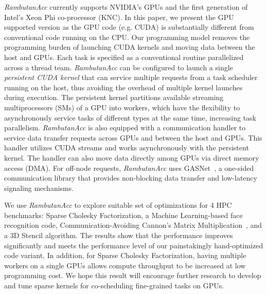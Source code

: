 {\em RambutanAcc} currently supports NVIDIA's GPUs and the first generation of Intel's Xeon Phi co-processor (KNC).
In this paper, we present the GPU supported version as the GPU code (e.g. CUDA) is substantially different from conventional code running on the CPU.
Our programming model removes the programming burden of launching CUDA kernels and moving data between the host and GPUs.
Each task is specified as a conventional routine parallelized across a thread team.
{\em RambutanAcc} can be configured to launch a single {\em persistent CUDA kernel} that can service multiple requests from a task scheduler running on the host, thus avoiding the overhead of multiple kernel launches during execution.
The persistent kernel partitions available streaming multiprocessors (SMs) of a GPU into workers, which have the flexibility to asynchronously service tasks of different types at the same time, increasing task parallelism.
{\em RambutanAcc} is also equipped with a communication handler to service data transfer requests across GPUs and between the host and GPUs.
This handler utilizes CUDA streams and works asynchronously with the persistent kernel.
The handler can also move data directly among GPUs via direct memory access (DMA).
For off-node requests, {\em RambutanAcc} uses GASNet~\cite{Bonachea:2002:gasnet}, a one-sided communication library %
that provides non-blocking data transfer and low-latency signaling mechanisms. %

We use {\em RambutanAcc} to explore suitable set of optimizations for 4 HPC benchmarks: Sparse Cholesky Factorization, a Machine Learning-based face recognition code, Communication-Avoiding Cannon's Matrix Multiplication~\cite{25Dcannon}, and a 3D Stencil algorithm.
The results show that the performance improves significantly and meets the performance level of our painstakingly hand-optimized code variant.
In addition, for Sparse Cholesky Factorization, having multiple workers on a single GPUs allows compute throughput to be increased at low programming cost. 
We hope this result will encourage further research to develop and tune sparse kernels for co-scheduling fine-grained tasks on GPUs.

